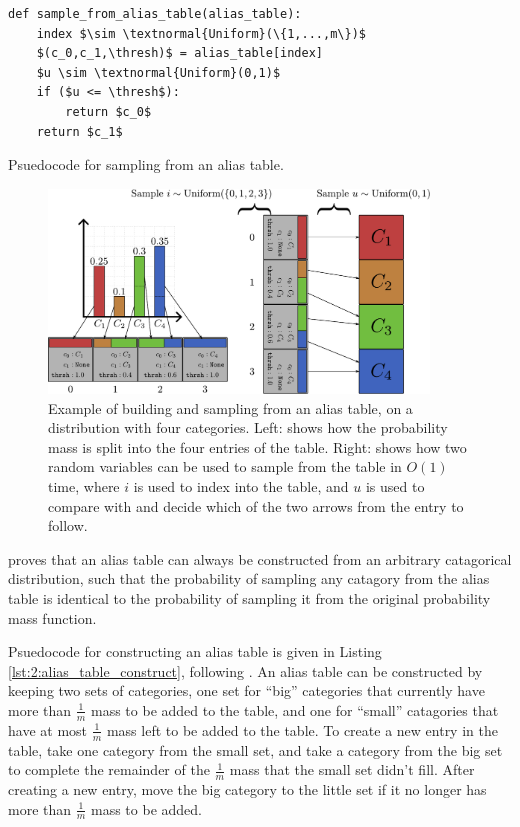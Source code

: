     \begin{Listing}
        \begin{lstlisting}
def sample_from_alias_table(alias_table):
    index $\sim \textnormal{Uniform}(\{1,...,m\})$
    $(c_0,c_1,\thresh)$ = alias_table[index]
    $u \sim \textnormal{Uniform}(0,1)$
    if ($u <= \thresh$):
        return $c_0$ 
    return $c_1$
        \end{lstlisting}
        \caption{Psuedocode for sampling from an alias table.}
        \label{lst:2:alias_table_sample}
    \end{Listing}

        
    \begin{figure}
        \centering\includegraphics[width=0.9\textwidth]{figures/ch2/alias_table.pdf} 
        \caption[Example of building and sampling from an alias table.]{Example of building and sampling from an alias table, on a distribution with four categories. Left: shows how the probability mass is split into the four entries of the table. Right: shows how two random variables can be used to sample from the table in $O(1)$ time, where $i$ is used to index into the table, and $u$ is used to compare with \thresh\ewe and decide which of the two arrows from the entry to follow.}
        \label{fig:2:alias_table_eg} 
    \end{figure}

    \citet{alias_method_two} proves that an alias table can always be constructed from an arbitrary catagorical distribution, such that the probability of sampling any catagory from the alias table is identical to the probability of sampling it from the original probability mass function. 

    Psuedocode for constructing an alias table is given in Listing \ref{lst:2:alias_table_construct}, following \cite{alias_method_one,alias_method_two}. An alias table can be constructed by keeping two sets of categories, one set for ``big'' categories that currently have more than $\frac{1}{m}$ mass to be added to the table, and one for ``small'' catagories that have at most $\frac{1}{m}$ mass left to be added to the table. To create a new entry in the table, take one category from the small set, and take a category from the big set to complete the remainder of the $\frac{1}{m}$ mass that the small set didn't fill. After creating a new entry, move the big category to the little set if it no longer has more than $\frac{1}{m}$ mass to be added. 

